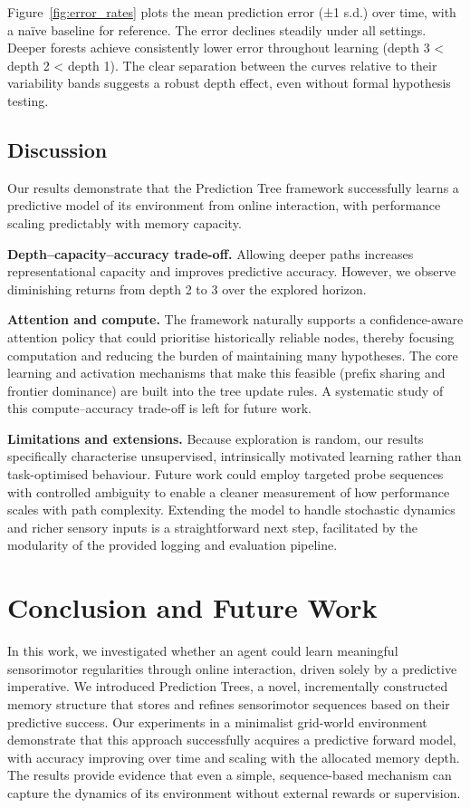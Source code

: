 \documentclass[11pt]{article}
\begin{document}
Figure~\ref{fig:error_rates} plots the mean prediction error (±1 s.d.) over time, with a naïve baseline for reference. The error declines steadily under all settings. Deeper forests achieve consistently lower error throughout learning (depth 3 < depth 2 < depth 1). The clear separation between the curves relative to their variability bands suggests a robust depth effect, even without formal hypothesis testing.

\subsection{Discussion}

Our results demonstrate that the Prediction Tree framework successfully learns a predictive model of its environment from online interaction, with performance scaling predictably with memory capacity.

\textbf{Depth–capacity–accuracy trade-off.} Allowing deeper paths increases representational capacity and improves predictive accuracy. However, we observe diminishing returns from depth 2 to 3 over the explored horizon.

\textbf{Attention and compute.} The framework naturally supports a confidence-aware attention policy that could prioritise historically reliable nodes, thereby focusing computation and reducing the burden of maintaining many hypotheses. The core learning and activation mechanisms that make this feasible (prefix sharing and frontier dominance) are built into the tree update rules. A systematic study of this compute–accuracy trade-off is left for future work.

\textbf{Limitations and extensions.} Because exploration is random, our results specifically characterise unsupervised, intrinsically motivated learning rather than task-optimised behaviour. Future work could employ targeted probe sequences with controlled ambiguity to enable a cleaner measurement of how performance scales with path complexity. Extending the model to handle stochastic dynamics and richer sensory inputs is a straightforward next step, facilitated by the modularity of the provided logging and evaluation pipeline.

\newpage
\section{Conclusion and Future Work}

In this work, we investigated whether an agent could learn meaningful sensorimotor regularities through online interaction, driven solely by a predictive imperative. We introduced Prediction Trees, a novel, incrementally constructed memory structure that stores and refines sensorimotor sequences based on their predictive success. Our experiments in a minimalist grid-world environment demonstrate that this approach successfully acquires a predictive forward model, with accuracy improving over time and scaling with the allocated memory depth. The results provide evidence that even a simple, sequence-based mechanism can capture the dynamics of its environment without external rewards or supervision.
\end{document}
